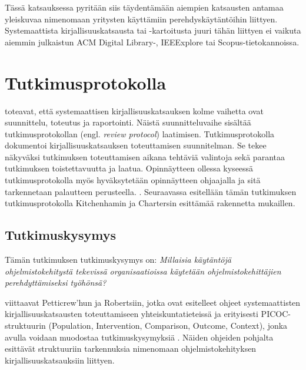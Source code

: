 \documentclass[utf8]{gradu3}
\begin{document}
Tässä katsauksessa pyritään siis täydentämään aiempien katsausten antamaa yleiskuvaa nimenomaan yritysten käyttämiin perehdyskäytäntöihin liittyen. Systemaattista kirjallisuuskatsausta tai -kartoitusta juuri tähän liittyen ei vaikuta aiemmin julkaistun ACM Digital Library-, IEEExplore tai Scopus-tietokannoissa. 

\chapter{Tutkimusprotokolla}
\label{paaluku-protokolla}

\textcite{kitchenham-charters-2007} toteavat, että systemaattisen kirjallisuuskatsauksen kolme vaihetta ovat suunnittelu, toteutus ja raportointi. Näistä suunnitteluvaihe sisältää tutkimusprotokollan (engl. \textit{review protocol}) laatimisen. Tutkimusprotokolla dokumentoi kirjallisuuskatsauksen toteuttamisen suunnitelman. Se tekee näkyväksi tutkimuksen toteuttamisen aikana tehtäviä valintoja sekä parantaa tutkimuksen toistettavuutta ja laatua. Opinnäytteen ollessa kyseessä tutkimusprotokolla myös hyväksytetään opinnäytteen ohjaajalla ja sitä tarkennetaan palautteen perusteella. \parencite{kitchenham-charters-2007}. Seuraavassa esitellään tämän tutkimuksen tutkimusprotokolla Kitchenhamin ja Chartersin esittämää rakennetta mukaillen.

\section{Tutkimuskysymys}
\label{luku:tutkimuskysymys}

Tämän tutkimuksen tutkimuskysymys on: \textit{Millaisia käytäntöjä ohjelmistokehitystä tekevissä organisaatioissa käytetään ohjelmistokehittäjien perehdyttämiseksi työhönsä?}

\textcite{kitchenham-charters-2007} viittaavat Petticrew'hun ja Robertsiin, jotka ovat esitelleet ohjeet systemaattisten kirjallisuuskatsausten toteuttamiseen yhteiskuntatieteissä ja erityisesti PICOC-struktuurin (Population, Intervention, Comparison, Outcome, Context), jonka avulla voidaan muodostaa tutkimuskysymyksiä \parencite{petticrew-roberts-2006}. Näiden ohjeiden pohjalta \textcite{kitchenham-charters-2007} esittävät struktuuriin tarkennuksia nimenomaan ohjelmistokehityksen kirjallisuuskatsauksiin liittyen. 
\end{document}
